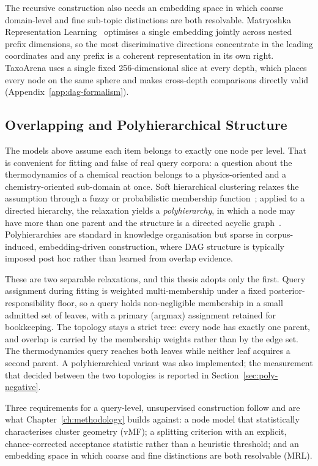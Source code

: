 The recursive construction also needs an embedding space in which
coarse domain-level and fine sub-topic distinctions are both
resolvable. Matryoshka Representation
Learning~\parencite{kusupati2022mrl} optimises a single embedding
jointly across nested prefix dimensions, so the most discriminative
directions concentrate in the leading coordinates and any prefix is a
coherent representation in its own right. TaxoArena uses a single
fixed 256-dimensional slice at every depth, which places every node
on the same sphere and makes cross-depth comparisons directly valid
(Appendix~\ref{app:dag-formalism}).

\subsection*{Overlapping and Polyhierarchical Structure}

The models above assume each item belongs to exactly one node per
level. That is convenient for fitting and false of real query
corpora: a question about the thermodynamics of a chemical reaction
belongs to a physics-oriented and a chemistry-oriented sub-domain at
once. Soft hierarchical clustering relaxes the assumption through a
fuzzy or probabilistic membership function~\parencite{fuzzyhc1969};
applied to a directed hierarchy, the relaxation yields a
\textit{polyhierarchy}, in which a node may have more than one parent
and the structure is a directed acyclic
graph~\parencite{polyhierarchy2006}. Polyhierarchies are standard in
knowledge organisation but sparse in corpus-induced,
embedding-driven construction, where DAG structure is typically
imposed post hoc rather than learned from overlap evidence.

These are two separable relaxations, and this thesis adopts only the
first. Query assignment during fitting is weighted multi-membership
under a fixed posterior-responsibility floor, so a query holds
non-negligible membership in a small admitted set of leaves, with a
primary (argmax) assignment retained for bookkeeping. The topology
stays a strict tree: every node has exactly one parent, and overlap
is carried by the membership weights rather than by the edge set. The
thermodynamics query reaches both leaves while neither leaf acquires
a second parent. A polyhierarchical variant was also implemented; the
measurement that decided between the two topologies is reported in
Section~\ref{sec:poly-negative}.

\bigskip
\noindent
Three requirements for a query-level, unsupervised construction
follow and are what Chapter~\ref{ch:methodology} builds
against: a node model that statistically characterises cluster
geometry (vMF); a splitting criterion with an explicit,
chance-corrected acceptance statistic rather than a heuristic
threshold; and an embedding space in which coarse and fine
distinctions are both resolvable (MRL).


